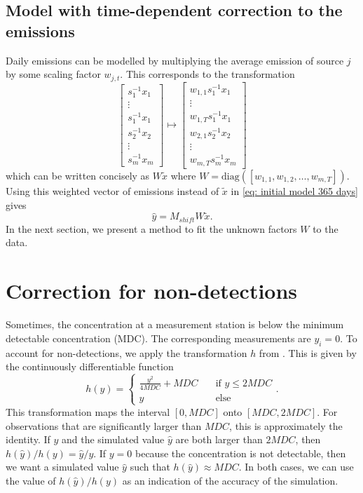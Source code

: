\documentclass{article}
\begin{document}
\subsection{Model with time-dependent correction to the emissions}
Daily emissions can be modelled by multiplying the average emission of source $j$ by some scaling factor $w_{j,t}$. This corresponds to the 
transformation
$$
\begin{bmatrix}
    s_1^{-1} x_1 \\
    \vdots \\
    s_1^{-1} x_1 \\ 
    s_2^{-1} x_2 \\
    \vdots \\ 
    s_m^{-1} x_m
\end{bmatrix}
\mapsto
\begin{bmatrix}
    w_{1,1} s_1^{-1} x_1 \\
    \vdots \\
    w_{1,T} s_1^{-1} x_1 \\ 
    w_{2,1} s_2^{-1} x_2 \\
    \vdots \\ 
    w_{m, T} s_m^{-1} x_m
\end{bmatrix}
$$
which can be written concisely as $W\tilde{x}$ where $W = \mathrm{diag}([w_{1,1}, w_{1,2},\dots,w_{m,T}])$.
Using this weighted vector of emissions instead of $\tilde{x}$ in \cref{eq: initial model 365 days} gives
\begin{equation}
    \label{eq: time-evolving model concise}
\hat{y} = M_{shift} W \tilde{x}
.\end{equation}
In the next section, we present a method to fit the unknown factors $W$ to the data.

\section{Correction for non-detections}
\label{sec: nondetections}

Sometimes, the concentration at a measurement station is below the minimum detectable concentration (MDC). The corresponding measurements are $y_i = 0$.
To account for non-detections, we apply the transformation $h$ from \cite{deMeutter2022uncertainty}. This is given by the continuously differentiable function
$$
h(y) = \begin{cases}
    \frac{y^2}{4MDC} + MDC &\quad \text{if } y \le 2MDC \\
    y &\quad \text{else}
\end{cases}
.$$
This transformation maps the interval $[0, MDC]$ onto $[MDC, 2MDC]$. For observations that are significantly larger than $MDC$, this is approximately the identity. If $y$ and the simulated value $\hat{y}$ are both larger than $2MDC$, then $h(\hat{y}) / h(y) = \hat{y} / y$. If $y = 0$ because the concentration is not detectable, then we want a simulated value $\hat{y}$ such that $h(\hat{y}) \approx MDC$. In both cases, we can use the value of $h(\hat{y}) / h(y)$ as an indication of the accuracy of the simulation.
\end{document}
